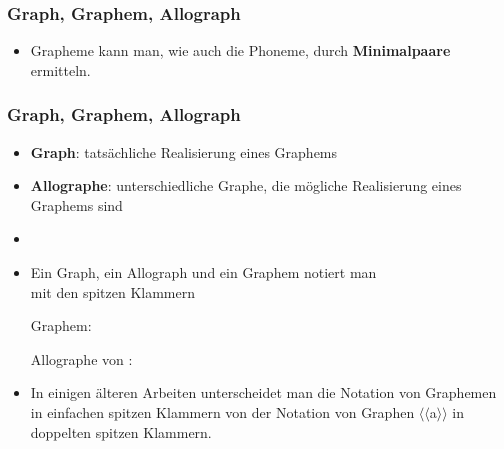 \begin{frame}
\frametitle{Graph, Graphem, Allograph}

\begin{itemize}
	\item Grapheme kann man, wie auch die Phoneme, durch \textbf{Minimalpaare} ermitteln.
	
	\pause
	 
\settowidth{} 

	\ea {} \vs {} 
	
	\ex {} \vs {} 
	
	\ex {} \vs {} 
	
	\ex {} \vs {} 
	\z
\end{itemize}

\end{frame}


\begin{frame}
\frametitle{Graph, Graphem, Allograph}

	\begin{itemize}
		\item \textbf{Graph}: tatsächliche Realisierung eines Graphems
		\item \textbf{Allographe}: unterschiedliche Graphe, die mögliche Realisierung eines Graphems sind
		\item[]
		\item Ein Graph, ein Allograph und ein Graphem notiert man\\
		mit den spitzen Klammern \ab{}
	
		\ea Graphem: 

		\ex	Allographe von :      
		\z 
		
		\item In einigen älteren Arbeiten unterscheidet man die Notation von Graphemen  in einfachen spitzen Klammern von der Notation von Graphen $\langle \langle$a$\rangle \rangle$ in doppelten spitzen Klammern.
	\end{itemize}


\end{frame}


